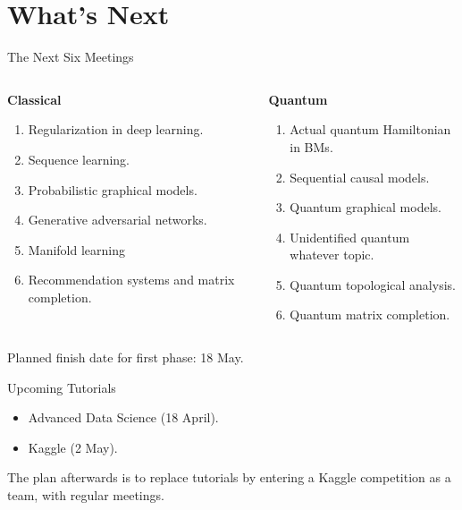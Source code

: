 \documentclass[compress]{beamer}\usetheme{Warsaw}\usecolortheme{crane}\useoutertheme[subsection=false]{smoothbars}
\begin{document}
\section{What's Next}
\begin{frame}{The Next Six Meetings}
\begin{columns}[T]
	\begin{column}{.5\textwidth}
	\textbf{Classical}
	 \begin{enumerate}
	  	\item Regularization in deep learning.
	  	\item Sequence learning.
	  	\item Probabilistic graphical models.
	  	\item Generative adversarial networks.
	  	\item Manifold learning\vspace{1.2em}
	  	
	  	\item Recommendation systems and matrix completion.
	  \end{enumerate}
	\end{column}
	\begin{column}{.5\textwidth}
	\textbf{Quantum}
	 \begin{enumerate}
	 	\item Actual quantum Hamiltonian in BMs.
	 	\item Sequential causal models.
	 	\item Quantum graphical models.\vspace{1.2em}
	 	
	 	\item Unidentified quantum whatever topic.
	 	\item Quantum topological analysis.
	 	\item Quantum matrix completion.
	 \end{enumerate}
	\end{column}
\end{columns}
\vspace{1em}

Planned finish date for first phase: 18 May.
\end{frame}

\begin{frame}{Upcoming Tutorials}
\begin{itemize}
	\item Advanced Data Science (18 April).
	\item Kaggle (2 May).
\end{itemize}

The plan afterwards is to replace tutorials by entering a Kaggle competition as a team, with regular meetings.

\end{frame}
\end{document}
